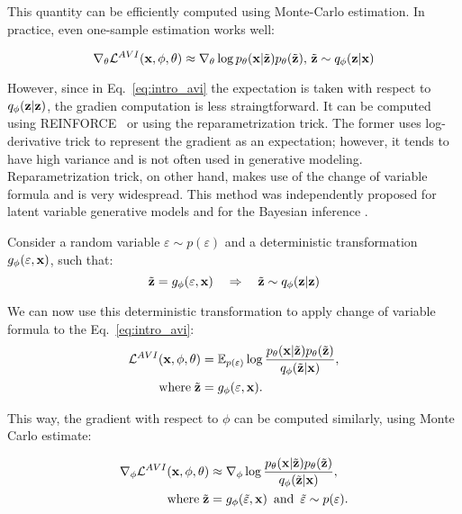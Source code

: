 This quantity can be efficiently computed using Monte-Carlo estimation. In practice, even one-sample estimation works well:

\begin{equation}
    \nabla_{\theta}\mathcal{L}^{AVI}({\mathbf{x}}, \phi, \theta) \approx \nabla_{\theta} \log p_{\theta}({\mathbf{x}}|\tilde{{\mathbf{z}}})p_{\theta}(\tilde{{\mathbf{z}}}),\, \tilde{{\mathbf{z}}} \sim q_{\phi}({\mathbf{z}}|{\mathbf{x}})
\end{equation}

However, since in Eq.~\ref{eq:intro_avi} the expectation is taken with respect to $q_{\phi}({\mathbf{z}}|{\mathbf{z}})$, the gradien computation is less straingtforward. It can be computed using REINFORCE~\citep{williams1992simple} or using the reparametrization trick.  The former uses log-derivative trick to represent the gradient as an expectation; however, it tends to have high variance and is not often used in generative modeling. Reparametrization trick, on other hand, makes use of the change of variable formula and is very widespread. This method was independently proposed for latent variable generative models \cite{kingma2014autoencoding, rezende2014stochastic} and for the Bayesian inference \citep{titsias2014doubly}. 

Consider a random variable $\varepsilon \sim p(\varepsilon)$ and a deterministic transformation $g_{\phi}(\varepsilon, {\mathbf{x}})$, such that:
\begin{equation}
    \tilde{{\mathbf{z}}} = g_{\phi}(\varepsilon, {\mathbf{x}})\quad \Rightarrow \quad  \tilde{{\mathbf{z}}} \sim q_{\phi}({\mathbf{z}}|{\mathbf{z}})
\end{equation}

We can now use this deterministic transformation to apply change of variable formula to the Eq.~\ref{eq:intro_avi}:
\begin{equation}
\begin{aligned}
     \mathcal{L}^{AVI}({\mathbf{x}}, \phi, \theta) &=  \mathbb{E}_{p(\varepsilon)}\log  \frac{p_{\theta}({\mathbf{x}}|\tilde{{\mathbf{z}}})p_{\theta}(\tilde{{\mathbf{z}}})}{q_{\phi}(\tilde{{\mathbf{z}}}|{\mathbf{x}})},\\
     \text{where}\; \tilde{{\mathbf{z}}} &= g_{\phi}(\varepsilon, {\mathbf{x}}).
\end{aligned}
\end{equation}

This way, the  gradient with respect to $\phi$ can be computed similarly, using Monte Carlo estimate:

\begin{equation}
\begin{aligned}
    \nabla_{\phi}\mathcal{L}^{AVI}({\mathbf{x}}, \phi, \theta) &\approx  \nabla_{\phi}\log  \frac{p_{\theta}({\mathbf{x}}|\tilde{{\mathbf{z}}})p_{\theta}(\tilde{{\mathbf{z}}})}{q_{\phi}(\tilde{{\mathbf{z}}}|{\mathbf{x}})}, \\
    \text{where}\; \tilde{{\mathbf{z}}} &= g_{\phi}(\tilde{\varepsilon}, {\mathbf{x}})\,\text{ and }\, \tilde{\varepsilon} \sim p(\varepsilon).
\end{aligned}
\end{equation}

